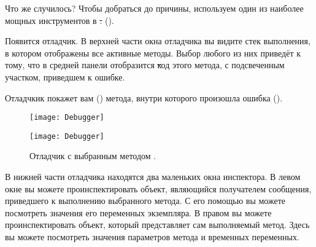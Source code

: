 \documentclass[a4paper,10pt,twoside]{book}
\begin{document}
{\noindent
Что же случилось? Чтобы добраться до причины, используем один из наиболее мощных инструментов в \st:  ().


Появится отладчик.
В верхней части окна отладчика вы видите стек выполнения, в котором отображены все активные методы. Выбор любого из них приведёт к тому, что в средней панели отобразится \st код этого метода, с подсвеченным участком, приведшем к ошибке.

\dothis{Кликните на строке
\ct{LOGame>>>toggleNeighboursOfCellAt:at:} (наверху стека).}
Отладчкик покажет вам  () метода, внутри которого произошла ошибка ().

\begin{figure}[ht]
\ifluluelse
	{\centerline {\texttt{[image: Debugger]}}}
	{\centerline {\texttt{[image: Debugger]}}}
\caption{Отладчик с выбранным методом .
}
\end{figure}

В нижней части отладчика находятся два маленьких окна инспектора. В левом окне вы можете проинспектировать объект, являющийся получателем сообщения, приведшего к выполнению выбранного метода. С его помощью вы можете посмотреть значения его переменных экземпляра.
В правом вы можете проинспектировать объект, который представляет сам выполняемый метод. Здесь вы можете посмотреть значения параметров метода и временных переменных.

}
\end{document}
